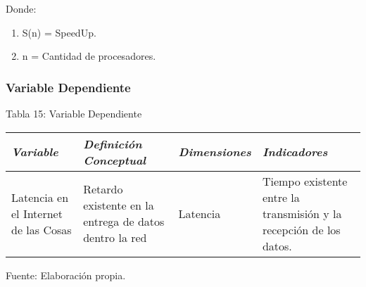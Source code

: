 \begin{table}[h!]
{\begin{enumerate}
{\begin{center}
                            \end{center}            
                            Donde:            
                            \vskip 0.3cm
                            \begin{enumerate}
                                \item[]{S(n) = SpeedUp.}
                                \item[]{n = Cantidad de procesadores.}
                            \end{enumerate}\par
                        }
                    \end{enumerate}\par                 
                              
                }\par                 
            \end{table}
                    
        \newpage
        \subsubsection{Variable Dependiente}
            \begin{table}[h!]
                \centering
                { Tabla 15: Variable Dependiente}\par
                \begin{tabular}{|p{3cm}|p{3cm}|p{3cm}|p{3cm}|} \hline
                    
                
                \textit{{\bf{Variable}}} &
                \textit{{\bf{Definición Conceptual}}} &
                \textit{{\bf{Dimensiones}}} &
                \textit{{\bf{Indicadores}}}
                \\ \hline

                Latencia en el Internet de las Cosas &
                Retardo existente en la entrega de datos dentro la red &
                Latencia &
                Tiempo existente entre la transmisión y la recepción de los datos. 
                \\ \hline

                \end{tabular}
                \begin{center}
                    \vskip -0.2cm
                    {\small{Fuente: Elaboración propia.}}
                \end{center}
            \end{table}
